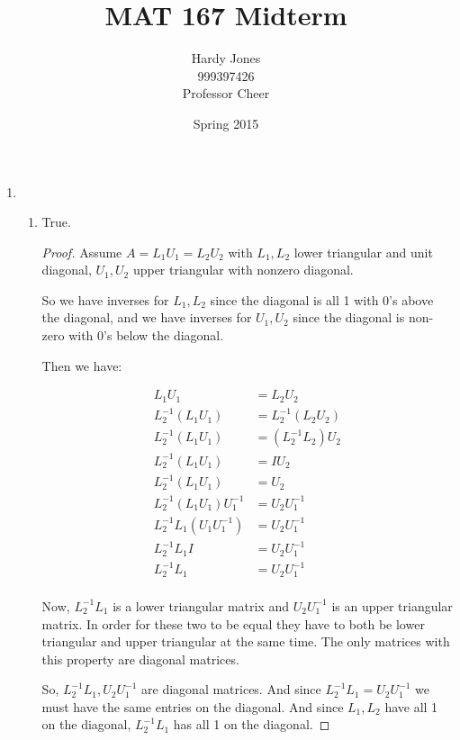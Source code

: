 \documentclass[12pt,letterpaper]{article}
\title{MAT 167 Midterm\vspace{-2ex}}
\author{Hardy Jones\\
        999397426\\
        Professor Cheer\vspace{-2ex}}
\date{Spring 2015}
\begin{document}
  \maketitle

  \begin{enumerate}
    \item
      \begin{enumerate}
        \item
          True.

          \begin{proof}
            Assume $A = L_1U_1 = L_2U_2$ with $L_1, L_2$ lower triangular and unit diagonal,
            $U_1, U_2$ upper triangular with nonzero diagonal.

            So we have inverses for $L_1, L_2$ since the diagonal is all 1 with 0's above the diagonal,
            and we have inverses for $U_1, U_2$ since the diagonal is non-zero with 0's below the diagonal.

            Then we have:

            \begin{align*}
              L_1U_1 &= L_2U_2 \\
              L_2^{-1}\left(L_1U_1\right) &= L_2^{-1}\left(L_2U_2\right) \\
              L_2^{-1}\left(L_1U_1\right) &= \left(L_2^{-1}L_2\right)U_2 \\
              L_2^{-1}\left(L_1U_1\right) &= IU_2 \\
              L_2^{-1}\left(L_1U_1\right) &= U_2 \\
              L_2^{-1}\left(L_1U_1\right)U_1^{-1} &= U_2U_1^{-1} \\
              L_2^{-1}L_1\left(U_1U_1^{-1}\right) &= U_2U_1^{-1} \\
              L_2^{-1}L_1I &= U_2U_1^{-1} \\
              L_2^{-1}L_1 &= U_2U_1^{-1} \\
            \end{align*}

            Now, $L_2^{-1}L_1$ is a lower triangular matrix and
            $U_2U_1^{-1}$ is an upper triangular matrix.
            In order for these two to be equal they have to both be lower triangular and upper triangular at the same time.
            The only matrices with this property are diagonal matrices.

            So, $L_2^{-1}L_1, U_2U_1^{-1}$ are diagonal matrices.
            And since $L_2^{-1}L_1 = U_2U_1^{-1}$ we must have the same entries on the diagonal.
            And since $L_1, L_2$ have all 1 on the diagonal, $L_2^{-1}L_1$ has all 1 on the diagonal.


\end{proof}
\end{enumerate}
\end{enumerate}
\end{document}
